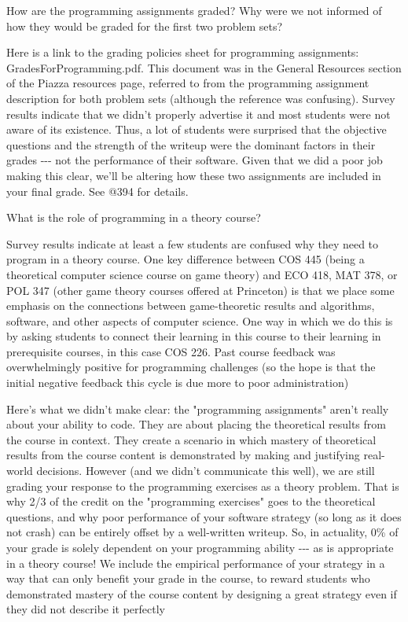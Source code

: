 \documentclass[]{article}
\begin{document}
{How are the programming assignments graded? Why were we not informed of
how they would be graded for the first two problem sets?}

{Here is a link to the grading policies sheet for programming
assignments: GradesForProgramming.pdf. This document was in the General
Resources section of the Piazza resources page, referred to from the
programming assignment description for both problem sets (although the
reference was confusing). Survey results indicate that we didn't
properly advertise it and most students were not aware of its existence.
Thus, a lot of students were surprised that the objective questions and
the strength of the writeup were the dominant factors in their grades
-\/-\/- not the performance of their software. Given that we did a poor
job making this clear, we'll be altering how these two assignments are
included in your final grade. See @394 for details.}

{What is the role of programming in a theory course?}

{Survey results indicate at least a few students are confused why they
need to program in a theory course. One key difference between COS 445
(being a theoretical computer science course on game theory) and ECO
418, MAT 378, or POL 347 (other game theory courses offered at
Princeton) is that we place some emphasis on the connections between
game-theoretic results and algorithms, software, and other aspects of
computer science. One way in which we do this is by asking students to
connect their learning in this course to their learning in prerequisite
courses, in this case COS 226. Past course feedback was overwhelmingly
positive for programming challenges (so the hope is that the initial
negative feedback this cycle is due more to poor administration)}

{Here's what we didn't make clear: the "programming assignments" aren't
really about your ability to code. They are about placing the
theoretical results from the course in context. They create a scenario
in which mastery of theoretical results from the course content is
demonstrated by making and justifying real-world decisions. However (and
we didn't communicate this well), we are still grading your response to
the programming exercises as a theory problem. That is why 2/3 of the
credit on the "programming exercises" goes to the theoretical questions,
and why poor performance of your software strategy (so long as it does
not crash) can be entirely offset by a well-written writeup. So, in
actuality, 0\% of your grade is solely dependent on your programming
ability -\/-\/- as is appropriate in a theory course! We include the
empirical performance of your strategy in a way that can only benefit
your grade in the course, to reward students who demonstrated mastery of
the course content by designing a great strategy even if they did not
describe it perfectly}
\end{document}
